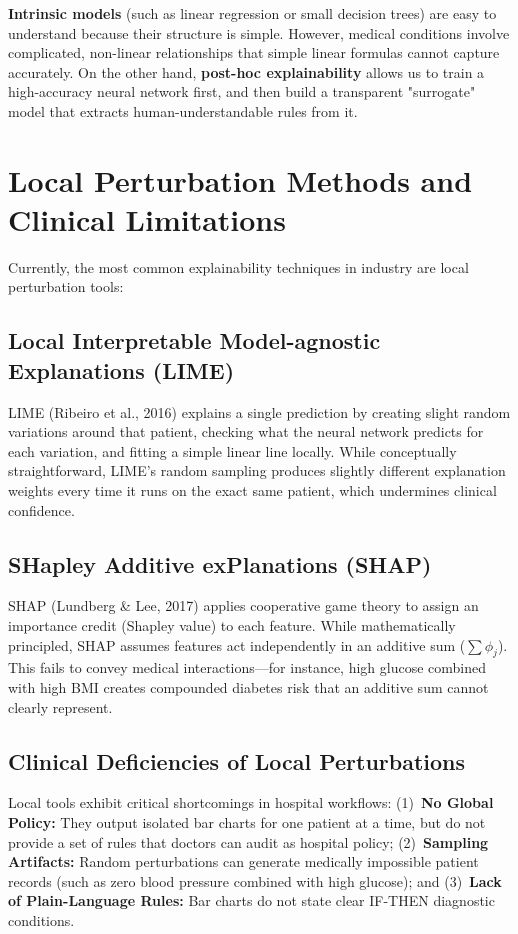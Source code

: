 \documentclass{report}
\begin{document}
\textbf{Intrinsic models} (such as linear regression or small decision trees) are easy to understand because their structure is simple. However, medical conditions involve complicated, non-linear relationships that simple linear formulas cannot capture accurately. On the other hand, \textbf{post-hoc explainability} allows us to train a high-accuracy neural network first, and then build a transparent "surrogate" model that extracts human-understandable rules from it.

\section{Local Perturbation Methods and Clinical Limitations}

Currently, the most common explainability techniques in industry are local perturbation tools:

\subsection{Local Interpretable Model-agnostic Explanations (LIME)}
LIME (Ribeiro et al., 2016) explains a single prediction by creating slight random variations around that patient, checking what the neural network predicts for each variation, and fitting a simple linear line locally. While conceptually straightforward, LIME's random sampling produces slightly different explanation weights every time it runs on the exact same patient, which undermines clinical confidence.

\subsection{SHapley Additive exPlanations (SHAP)}
SHAP (Lundberg \& Lee, 2017) applies cooperative game theory to assign an importance credit (Shapley value) to each feature. While mathematically principled, SHAP assumes features act independently in an additive sum ($\sum \phi_j$). This fails to convey medical interactions---for instance, high glucose combined with high BMI creates compounded diabetes risk that an additive sum cannot clearly represent.

\subsection{Clinical Deficiencies of Local Perturbations}
Local tools exhibit critical shortcomings in hospital workflows: (1)~\textbf{No Global Policy:} They output isolated bar charts for one patient at a time, but do not provide a set of rules that doctors can audit as hospital policy; (2)~\textbf{Sampling Artifacts:} Random perturbations can generate medically impossible patient records (such as zero blood pressure combined with high glucose); and (3)~\textbf{Lack of Plain-Language Rules:} Bar charts do not state clear IF-THEN diagnostic conditions.
\end{document}
